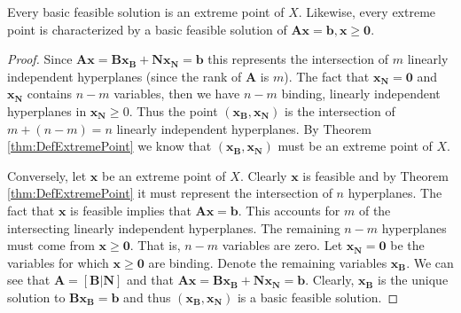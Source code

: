\begin{theorem} Every basic feasible solution is an extreme point of $X$. Likewise, every extreme point is characterized by a basic feasible solution of $\mathbf{A}\mathbf{x} = \mathbf{b}, \mathbf{x} \geq \mathbf{0}$.
\label{thm:BFSEP}
\end{theorem}
\begin{proof} Since $\mathbf{A}\mathbf{x} = \mathbf{B}\mathbf{x}_\mathbf{B} + \mathbf{N}\mathbf{x}_\mathbf{N} = \mathbf{b}$ this represents the intersection of $m$ linearly independent hyperplanes (since the rank of $\mathbf{A}$ is $m$). The fact that $\mathbf{x}_\mathbf{N} = \mathbf{0}$ and $\mathbf{x_N}$ contains $n-m$ variables, then we have $n-m$ binding, linearly independent hyperplanes in $\mathbf{x}_\mathbf{N} \geq 0$. Thus the point $(\mathbf{x}_\mathbf{B}, \mathbf{x}_\mathbf{N})$ is the intersection of $m + (n-m) = n$ linearly independent hyperplanes. By Theorem \ref{thm:DefExtremePoint} we know that $(\mathbf{x}_\mathbf{B}, \mathbf{x}_\mathbf{N})$ must be an extreme point of $X$. 

Conversely, let $\mathbf{x}$ be an extreme point of $X$. Clearly $\mathbf{x}$ is feasible and by Theorem \ref{thm:DefExtremePoint} it must represent the intersection of $n$ hyperplanes. The fact that $\mathbf{x}$ is feasible implies that $\mathbf{A}\mathbf{x} = \mathbf{b}$. This accounts for $m$ of the intersecting linearly independent hyperplanes. The remaining $n-m$ hyperplanes must come from $\mathbf{x} \geq \mathbf{0}$. That is, $n-m$ variables are zero. Let $\mathbf{x}_\mathbf{N} = \mathbf{0}$ be the variables for which $\mathbf{x} \geq \mathbf{0}$ are binding. Denote the remaining variables $\mathbf{x}_\mathbf{B}$. We can see that $\mathbf{A} = [\mathbf{B} | \mathbf{N}]$ and that $\mathbf{A}\mathbf{x} = \mathbf{B}\mathbf{x}_\mathbf{B} + \mathbf{N}\mathbf{x}_\mathbf{N} = \mathbf{b}$. Clearly, $\mathbf{x}_\mathbf{B}$ is the unique solution to $\mathbf{B}\mathbf{x}_\mathbf{B} = \mathbf{b}$ and thus $(\mathbf{x}_\mathbf{B},\mathbf{x}_\mathbf{N})$ is a basic feasible solution. 
\end{proof}

